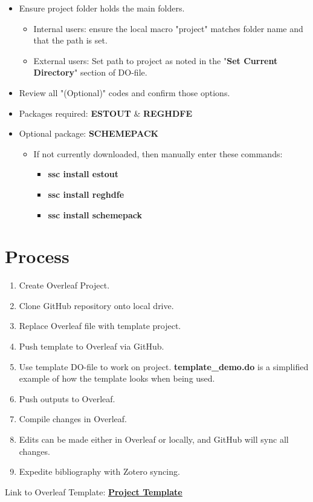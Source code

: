 \documentclass[12pt]{article}
\begin{document}
\begin{itemize}
\begin{itemize}
\item Ensure project folder holds the main folders.
\begin{itemize}
\item Internal users: ensure the local macro "project" matches folder name and that the path is set.
\item External users: Set path to project as noted in the "\textbf{Set Current Directory}" section of DO-file.
\end{itemize}

\item Review all "(Optional)" codes and confirm those options.
\item Packages required: \textbf{ESTOUT} \& \textbf{REGHDFE} 
\item Optional package: \textbf{SCHEMEPACK}

\begin{itemize}
\item If not currently downloaded, then manually enter these commands:
\begin{itemize}
\item \textbf{ssc install estout}
\item \textbf{ssc install reghdfe}
\item \textbf{ssc install schemepack}
\end{itemize}

\end{itemize}
\end{itemize}
\end{itemize}

\section{Process}

\begin{enumerate}
\item Create Overleaf Project.
\item Clone GitHub repository onto local drive.
\item Replace Overleaf file with template project.
\item Push template to Overleaf via GitHub.
\item Use template DO-file to work on project. \textbf{template\_demo.do} is a simplified example of how the template looks when being used.
\item Push outputs to Overleaf.
\item Compile changes in Overleaf.
\item Edits can be made either in Overleaf or locally, and GitHub will sync all changes.
\item Expedite bibliography with Zotero syncing.

\end{enumerate}

Link to Overleaf Template: \textbf{\underline{\href{https://www.overleaf.com/read/cnbkcvqwrsnh}{Project Template}}}
\end{document}
